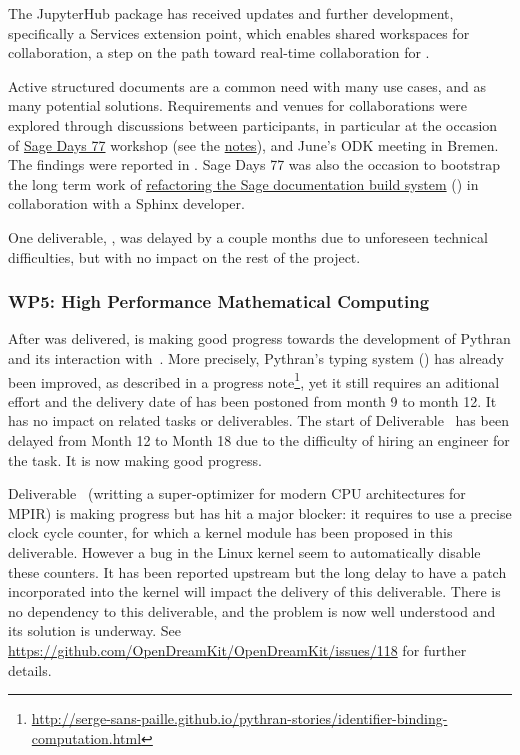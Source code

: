 \documentclass{deliverablereport}
\begin{document}
The JupyterHub package has received updates and further development,
specifically a Services extension point,
which enables shared workspaces for collaboration,
a step on the path toward real-time collaboration for .

Active structured documents are a common need with many use cases, and
as many potential solutions. Requirements and venues for
collaborations were explored through discussions between participants,
in particular at the occasion of
\href{https://wiki.sagemath.org/days77/}{Sage Days 77} workshop (see
the
\href{https://wiki.sagemath.org/days77/live-structured-documents}{notes}),
and June's ODK meeting in Bremen. The findings were reported in
. Sage Days 77 was also the occasion to bootstrap the long term work of
\href{https://wiki.sagemath.org/days77/documentation}{refactoring the
  Sage documentation build system} () in
collaboration with a Sphinx developer.

One deliverable, , was delayed by a
couple months due to unforeseen technical difficulties, but with no
impact on the rest of the project.

\subsubsection{WP5: High Performance Mathematical Computing}

After  was delivered,  is making good progress towards the development of Pythran and its
interaction with~\Sage.
More precisely, Pythran's typing system () has already been improved, as described
in a progress note\footnote{\url{http://serge-sans-paille.github.io/pythran-stories/identifier-binding-computation.html}},
yet it still requires an aditional effort and the delivery date of
 has been postoned from month 9 to month 12. It
has no impact on related tasks or
deliverables. The start of Deliverable~ has been
delayed from Month 12 to Month 18 due to the difficulty of hiring an engineer for the task. It is now
making good progress.

Deliverable~ (writting a super-optimizer for modern CPU
architectures for MPIR) is making progress but has hit a major blocker: it
requires to use a precise clock cycle counter, for which a kernel module has been
proposed in this deliverable. However a bug in the Linux kernel seem to
automatically disable these counters. It has been reported upstream but the long
delay to have a patch incorporated into the kernel will impact the delivery of
this deliverable. There is no dependency to this deliverable, and the problem is
now well understood and its solution is underway. See
\url{https://github.com/OpenDreamKit/OpenDreamKit/issues/118} for further details.
\end{document}
